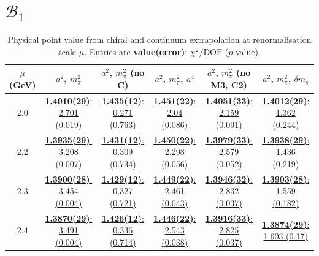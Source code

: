 \documentclass[12pt]{extarticle}
\begin{document}
\clearpage
\section{$\mathcal{B}_1$}
\begin{table}[h!]
\begin{center}
\begin{tabular}{|c|c|c|c|c|c|}
\hline
$\mu$ (GeV) & $a^2$, $m_\pi^2$& $a^2$, $m_\pi^2$ (no C)& $a^2$, $m_\pi^2$, $a^4$& $a^2$, $m_\pi^2$ (no M3, C2)& $a^2$, $m_\pi^2$, $\delta m_s$\\
\hline
2.0& \hyperlink{VVpAA/SUSY/bag_a2m2_20.pdf.1}{\textbf{1.4010(29)}: 2.701 (0.019)} & \hyperlink{VVpAA/SUSY/bag_a2m2noC_20.pdf.1}{\textbf{1.435(12)}: 0.271 (0.763)} & \hyperlink{VVpAA/SUSY/bag_a2a4m2_20.pdf.1}{\textbf{1.451(22)}: 2.04 (0.086)} & \hyperlink{VVpAA/SUSY/bag_a2m2mcut_20.pdf.1}{\textbf{1.4051(33)}: 2.159 (0.091)} & \hyperlink{VVpAA/SUSY/bag_a2m2delm_20.pdf.1}{\textbf{1.4012(29)}: 1.362 (0.244)}\\
2.2& \hyperlink{VVpAA/SUSY/bag_a2m2_22.pdf.1}{\textbf{1.3935(29)}: 3.208 (0.007)} & \hyperlink{VVpAA/SUSY/bag_a2m2noC_22.pdf.1}{\textbf{1.431(12)}: 0.309 (0.734)} & \hyperlink{VVpAA/SUSY/bag_a2a4m2_22.pdf.1}{\textbf{1.450(22)}: 2.298 (0.056)} & \hyperlink{VVpAA/SUSY/bag_a2m2mcut_22.pdf.1}{\textbf{1.3979(33)}: 2.579 (0.052)} & \hyperlink{VVpAA/SUSY/bag_a2m2delm_22.pdf.1}{\textbf{1.3938(29)}: 1.436 (0.219)}\\
2.3& \hyperlink{VVpAA/SUSY/bag_a2m2_23.pdf.1}{\textbf{1.3900(28)}: 3.454 (0.004)} & \hyperlink{VVpAA/SUSY/bag_a2m2noC_23.pdf.1}{\textbf{1.429(12)}: 0.327 (0.721)} & \hyperlink{VVpAA/SUSY/bag_a2a4m2_23.pdf.1}{\textbf{1.449(22)}: 2.461 (0.043)} & \hyperlink{VVpAA/SUSY/bag_a2m2mcut_23.pdf.1}{\textbf{1.3946(32)}: 2.832 (0.037)} & \hyperlink{VVpAA/SUSY/bag_a2m2delm_23.pdf.1}{\textbf{1.3903(28)}: 1.559 (0.182)}\\
2.4& \hyperlink{VVpAA/SUSY/bag_a2m2_24.pdf.1}{\textbf{1.3870(29)}: 3.491 (0.004)} & \hyperlink{VVpAA/SUSY/bag_a2m2noC_24.pdf.1}{\textbf{1.426(12)}: 0.336 (0.714)} & \hyperlink{VVpAA/SUSY/bag_a2a4m2_24.pdf.1}{\textbf{1.446(22)}: 2.543 (0.038)} & \hyperlink{VVpAA/SUSY/bag_a2m2mcut_24.pdf.1}{\textbf{1.3916(33)}: 2.825 (0.037)} & \hyperlink{VVpAA/SUSY/bag_a2m2delm_24.pdf.1}{\textbf{1.3874(29)}: 1.603 (0.17)}\\
\hline
\end{tabular}
\caption{Physical point value from chiral and continuum extrapolation at renormalisation scale $\mu$. Entries are \textbf{value(error)}: $\chi^2/\text{DOF}$ ($p$-value).}
\end{center}
\end{table}
\end{document}
